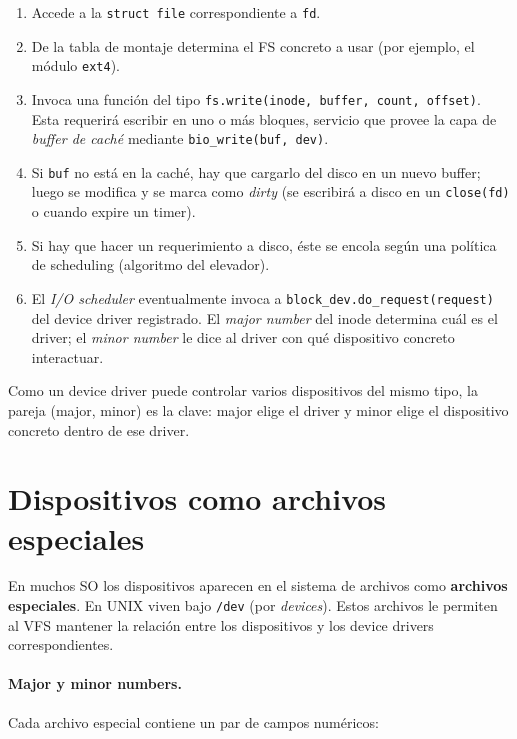 \documentclass[11pt,a4paper]{article}
\begin{document}
\begin{enumerate}[leftmargin=*]
    \item Accede a la \texttt{struct file} correspondiente a
        \texttt{fd}.
    \item De la tabla de montaje determina el FS concreto a usar (por
        ejemplo, el módulo \texttt{ext4}).
    \item Invoca una función del tipo
        \verb|fs.write(inode, buffer, count, offset)|.
        Esta requerirá escribir en uno o más bloques, servicio que
        provee la capa de \emph{buffer de caché} mediante
        \verb|bio_write(buf, dev)|.
    \item Si \texttt{buf} no está en la caché, hay que cargarlo del
        disco en un nuevo buffer; luego se modifica y se marca como
        \emph{dirty} (se escribirá a disco en un \texttt{close(fd)} o
        cuando expire un timer).
    \item Si hay que hacer un requerimiento a disco, éste se encola
        según una política de scheduling (algoritmo del elevador).
    \item El \emph{I/O scheduler} eventualmente invoca a
        \verb|block_dev.do_request(request)| del device driver
        registrado. El \emph{major number} del inode determina cuál es
        el driver; el \emph{minor number} le dice al driver con qué
        dispositivo concreto interactuar.
\end{enumerate}

\begin{idea}
Como un device driver puede controlar varios dispositivos del mismo
tipo, la pareja (major, minor) es la clave: major elige el driver y
minor elige el dispositivo concreto dentro de ese driver.
\end{idea}

\section{Dispositivos como archivos especiales}

En muchos SO los dispositivos aparecen en el sistema de archivos como
\textbf{archivos especiales}. En UNIX viven bajo \verb|/dev| (por
\emph{devices}). Estos archivos le permiten al VFS mantener la relación
entre los dispositivos y los device drivers correspondientes.

\paragraph{Major y minor numbers.}
Cada archivo especial contiene un par de campos numéricos:
\end{document}
